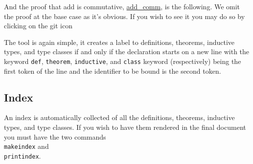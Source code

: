 And the proof that add is commutative, \hyperref[lean:add_comm]{\ttfamily add\_comm}, is the following.
We omit the proof at the base case as it's obvious.
If you wish to see it you may do so by clicking on the git icon

\noindent{}

The tool is again simple, it creates a label to definitions, theorems, inductive types, and type
classes if and only if the declaration starts on a new line with the keyword \texttt{def},
\texttt{theorem}, \texttt{inductive}, and \texttt{class} keyword (respectively) being the first
token of the line and the identifier to be bound is the second token.


\subsection{Index}

An index is automatically collected of all the definitions, theorems, inductive types, and type classes.
If you wish to have them rendered in the final document you must have the two commands \texttt{\\makeindex} and \texttt{\\printindex}.

